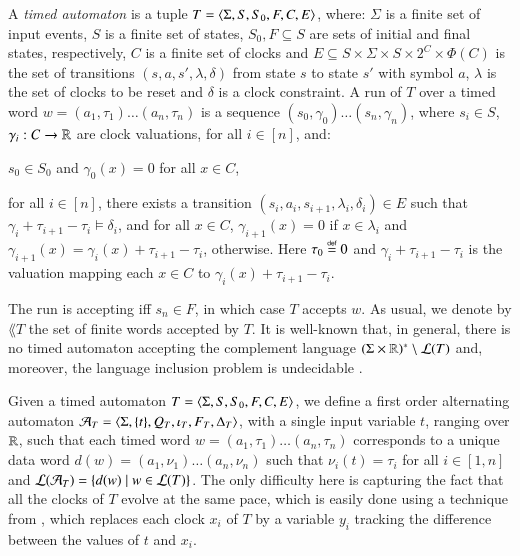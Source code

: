 A \emph{timed automaton} is a tuple $T = \langle \Sigma,S,S_0,F,C,E \rangle$,
where: $\Sigma$ is a finite set of input events, $S$ is a finite set
of states, $S_0, F \subseteq S$ are sets of initial and final states,
respectively, $C$ is a finite set of clocks and $E \subseteq S \times
\Sigma \times S \times 2^C \times \Phi(C)$ is the set of transitions
$(s,a,s',\lambda,\delta)$ from state $s$ to state $s'$ with symbol
$a$, $\lambda$ is the set of clocks to be reset and $\delta$ is a
clock constraint. A run of $T$ over a timed word $w = (a_1,\tau_1)
\ldots (a_n,\tau_n)$ is a sequence $(s_0,\gamma_0) \ldots
(s_n,\gamma_n)$, where $s_i \in S$, $\gamma_i : C \rightarrow {\bf \mathbb{R}}$
are clock valuations, for all $i \in [n]$, and: \begin{compactitem}
\item $s_0 \in S_0$ and $\gamma_0(x)=0$ for all $x \in C$, 
%
\item for all $i \in [n]$, there exists a transition
  $(s_i,a_i,s_{i+1},\lambda_i,\delta_i) \in E$ such that $\gamma_i +
  \tau_{i+1} - \tau_i \models \delta_i$, and for all $x \in C$,
  $\gamma_{i+1}(x) = 0$ if $x \in \lambda_i$ and $\gamma_{i+1}(x) = \gamma_i(x)
  + \tau_{i+1}-\tau_i$, otherwise. Here $\tau_0 \stackrel{\scriptscriptstyle{\mathsf{def}}}{=} 0$ and $\gamma_i +
  \tau_{i+1} - \tau_i$ is the valuation mapping each $x \in C$ to
  $\gamma_i(x) + \tau_{i+1} - \tau_i$.
\end{compactitem}
The run is accepting iff $s_n \in F$, in which case $T$ accepts
$w$. As usual, we denote by $\lang{T}$ the set of finite words
accepted by $T$. It is well-known that, in general, there is no timed
automaton accepting the complement language $(\Sigma\times{\bf \mathbb{R}})^*
\setminus {\mathcal L}({T})$ and, moreover, the language inclusion problem is
undecidable \cite{AlurDill94}.

Given a timed automaton $T = \langle \Sigma,S,S_0,F,C,E \rangle$, we define a
first order alternating automaton $\mathcal{A}_T =
\langle \Sigma,\{ t \},Q_T,\iota_T,F_T,\Delta_T \rangle$, with a single input
variable $t$, ranging over ${\bf \mathbb{R}}$, such that each timed word $w =
(a_1,\tau_1) \ldots (a_n,\tau_n)$ corresponds to a unique data word
$d(w) = (a_1,\nu_1) \ldots (a_n,\nu_n)$ such that $\nu_i(t) = \tau_i$
for all $i \in [1,n]$ and ${\mathcal L}({\mathcal{A}_T}) = \{ d(w) \mid
  w\in{\mathcal L}({T}) \}$. The only difficulty here is capturing the fact that
all the clocks of $T$ evolve at the same pace, which is easily done
using a technique from \cite{Fribourg98}, which replaces
each clock $x_i$ of $T$ by a variable $y_i$ tracking the difference
between the values of $t$ and $x_i$.


